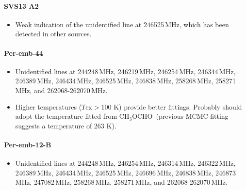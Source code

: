 \documentclass[twocolumn]{aastex62}
\newcommand{\mhz}{\mbox{\,MHz}}
\newcommand{\methylformate}{\mbox{CH$_{3}$OCHO}}
\begin{document}

\paragraph{SVS13 A2}
\begin{itemize}
  \item Weak indication of the unidentified line at 246525\mhz, which has been detected in other sources.
\end{itemize}

\paragraph{Per-emb-44}
\begin{itemize}
  \item Unidentified lines at 244248\mhz, 246219\mhz, 246254\mhz, 246344\mhz, 246389\mhz, 246434\mhz, 246525\mhz, 246838\mhz, 258268\mhz, 258271\mhz, and 262068-262070\mhz.
  \item Higher temperatures ($T\text{ex} > $100 K) provide better fittings.  Probably should adopt the temperature fitted from \methylformate\ (previous MCMC fitting suggests a temperature of 263 K).
\end{itemize}

\paragraph{Per-emb-12-B}
\begin{itemize}
  \item Unidentified lines at 244248\mhz, 246254\mhz, 246314\mhz, 246322\mhz, 246389\mhz, 246434\mhz, 246525\mhz, 246696\mhz, 246838\mhz, 246873\mhz, 247082\mhz, 258268\mhz, 258271\mhz, and 262068-262070\mhz.
\end{itemize}
\end{document}
